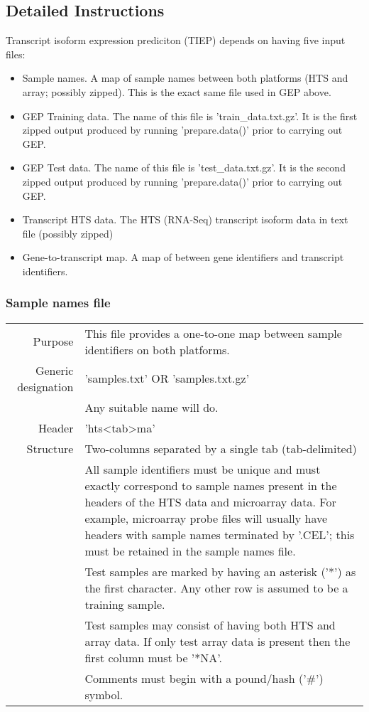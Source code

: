 \documentclass[a4paper,12pt]{article}
\begin{document}
\subsection{Detailed Instructions}
\label{tiep:detailed}
Transcript isoform expression prediciton (TIEP) depends on having five input files:
\begin{itemize}
\item Sample names. A map of sample names between both platforms (HTS and array; possibly zipped). This is the exact same file used in GEP above.
\item GEP Training data. The name of this file is 'train\_data.txt.gz'. It is the first zipped output produced by running 'prepare.data()' prior to carrying out GEP.
\item GEP Test data. The name of this file is 'test\_data.txt.gz'. It is the second zipped output produced by running 'prepare.data()' prior to carrying out GEP.
\item Transcript HTS data. The HTS (RNA-Seq) transcript isoform data in text file (possibly zipped)
\item Gene-to-transcript map. A map of between gene identifiers and transcript identifiers. 
\end{itemize}

\subsubsection{Sample names file}
\label{tiep:sample}

\begin{tabular}{rp{12cm}}
Purpose & This file provides a one-to-one map between sample identifiers on both platforms. \\
Generic designation & 'samples.txt' OR 'samples.txt.gz' \\
   & Any suitable name will do. \\
Header & 'hts\textless tab\textgreater ma' \\
Structure & Two-columns separated by a single tab (tab-delimited) \\
  & All sample identifiers must be unique and must exactly correspond to sample names present in the headers of the HTS data and microarray data. For example, microarray probe files will usually have headers with sample names terminated by '.CEL'; this must be retained in the sample names file. \\
  & Test samples are marked by having an asterisk ('*') as the first character. Any other row is assumed to be a training sample. \\
  & Test samples may consist of having both HTS and array data. If only test array data is present then the first column must be '*NA'. \\
  & Comments must begin with a pound/hash ('\#') symbol. \\
\end{tabular}
\end{document}
